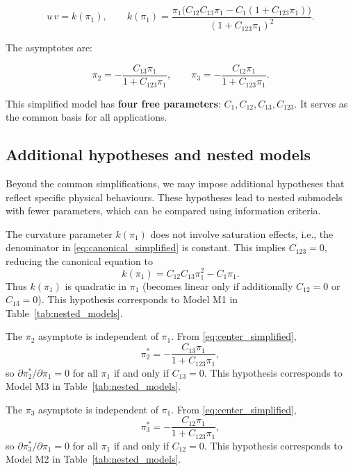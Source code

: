 \begin{equation}\label{eq:canonical_simplified}
\boxed{
u\,v = k(\pi_1),\qquad
k(\pi_1) = \frac{\pi_1\bigl(C_{12}C_{13}\pi_1 - C_1(1 + C_{123}\pi_1)\bigr)}{(1 + C_{123}\pi_1)^2}.
}
\end{equation}

The asymptotes are:

\begin{equation}\label{eq:asymptotes_simplified}
\boxed{
\pi_2 = -\frac{C_{13}\pi_1}{1 + C_{123}\pi_1},\qquad
\pi_3 = -\frac{C_{12}\pi_1}{1 + C_{123}\pi_1}.
}
\end{equation}

This simplified model has \textbf{four free parameters}: \(C_1, C_{12}, C_{13}, C_{123}\). It serves as the common basis for all applications.

\subsection{Additional hypotheses and nested models}

Beyond the common simplifications, we may impose additional hypotheses that reflect specific physical behaviours. These hypotheses lead to nested submodels with fewer parameters, which can be compared using information criteria.

\begin{assumption}
\label{hyp:no_saturation}
The curvature parameter \(k(\pi_1)\) does not involve saturation effects, i.e., the denominator in \eqref{eq:canonical_simplified} is constant. This implies \(C_{123}=0\), reducing the canonical equation to
\[
k(\pi_1) = C_{12}C_{13}\pi_1^2 - C_1\pi_1.
\]
Thus \(k(\pi_1)\) is quadratic in \(\pi_1\) (becomes linear only if additionally \(C_{12}=0\) or \(C_{13}=0\)). This hypothesis corresponds to Model M1 in Table~\ref{tab:nested_models}.
\end{assumption}

\begin{assumption}
\label{hyp:independence1}
The \(\pi_2\) asymptote is independent of \(\pi_1\). From \eqref{eq:center_simplified},
\[
\pi_2^* = -\frac{C_{13}\pi_1}{1+C_{123}\pi_1},
\]
so \(\partial\pi_2^*/\partial\pi_1 = 0\) for all \(\pi_1\) if and only if \(C_{13}=0\). This hypothesis corresponds to Model M3 in Table~\ref{tab:nested_models}.
\end{assumption}

\begin{assumption}
\label{hyp:independence2}
The \(\pi_3\) asymptote is independent of \(\pi_1\). From \eqref{eq:center_simplified},
\[
\pi_3^* = -\frac{C_{12}\pi_1}{1+C_{123}\pi_1},
\]
so \(\partial\pi_3^*/\partial\pi_1 = 0\) for all \(\pi_1\) if and only if \(C_{12}=0\). This hypothesis corresponds to Model M2 in Table~\ref{tab:nested_models}.
\end{assumption}

